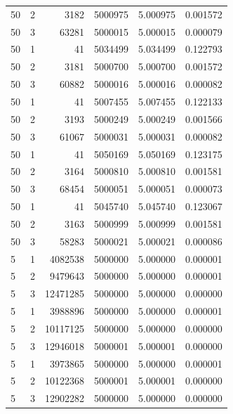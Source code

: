 \documentclass[a4paper,oneside]{book}
\begin{document}
\begin{longtable}[c]{|l|l|r|l|l|l|}
    50       & 2         & 3182      & 5000975 & 5.000975   & 0.001572 \\
    50       & 3         & 63281     & 5000015 & 5.000015   & 0.000079 \\
    50       & 1         & 41        & 5034499 & 5.034499   & 0.122793 \\
    50       & 2         & 3181      & 5000700 & 5.000700   & 0.001572 \\
    50       & 3         & 60882     & 5000016 & 5.000016   & 0.000082 \\
    50       & 1         & 41        & 5007455 & 5.007455   & 0.122133 \\
    50       & 2         & 3193      & 5000249 & 5.000249   & 0.001566 \\
    50       & 3         & 61067     & 5000031 & 5.000031   & 0.000082 \\
    50       & 1         & 41        & 5050169 & 5.050169   & 0.123175 \\
    50       & 2         & 3164      & 5000810 & 5.000810   & 0.001581 \\
    50       & 3         & 68454     & 5000051 & 5.000051   & 0.000073 \\
    50       & 1         & 41        & 5045740 & 5.045740   & 0.123067 \\
    50       & 2         & 3163      & 5000999 & 5.000999   & 0.001581 \\
    50       & 3         & 58283     & 5000021 & 5.000021   & 0.000086 \\
    5        & 1         & 4082538   & 5000000 & 5.000000   & 0.000001 \\
    5        & 2         & 9479643   & 5000000 & 5.000000   & 0.000001 \\
    5        & 3         & 12471285  & 5000000 & 5.000000   & 0.000000 \\
    5        & 1         & 3988896   & 5000000 & 5.000000   & 0.000001 \\
    5        & 2         & 10117125  & 5000000 & 5.000000   & 0.000000 \\
    5        & 3         & 12946018  & 5000001 & 5.000001   & 0.000000 \\
    5        & 1         & 3973865   & 5000000 & 5.000000   & 0.000001 \\
    5        & 2         & 10122368  & 5000001 & 5.000001   & 0.000000 \\
    5        & 3         & 12902282  & 5000000 & 5.000000   & 0.000000 \\

\end{longtable}
\end{document}
